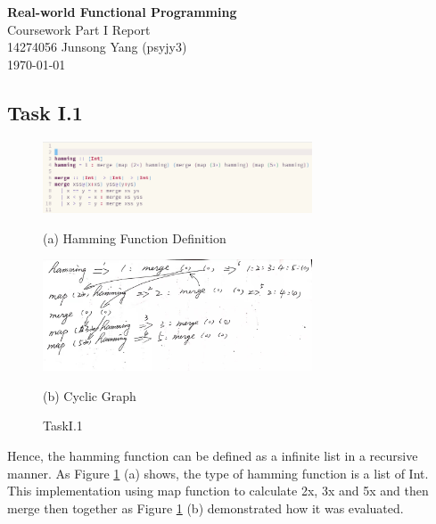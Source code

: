 \documentclass{article}
\begin{document}
\begin{center}
  \LARGE{\textbf{Real-world Functional Programming}} \\
  \Large{Coursework Part I Report} \\
  \normalsize{14274056 Junsong Yang (psyjy3)} \\
  \today
\end{center}


\begin{normalsize}
  \section{Task I.1}

  \begin{figure}[H]

    \begin{minipage}[b]{0.48\linewidth}
      \centering
      \centerline{\includegraphics[width=8.0cm]{Hamming}}
      \centerline{ (a) Hamming Function Definition}\medskip
    \end{minipage}
    \hfill
    \begin{minipage}[b]{0.48\linewidth}
      \centering
      \centerline{\includegraphics[width=8.0cm]{cyclic}}
      \centerline{ (b) Cyclic Graph}\medskip
    \end{minipage}
    \caption{TaskI.1}
    \label{fig:taskI.1}
  \end{figure}


  Hence, the hamming function can be defined as a infinite list in a recursive
  manner. As Figure \ref{fig:taskI.1} (a) shows, the type of hamming function is
  a list of Int. This implementation using map function to calculate 2x, 3x and
  5x and then merge then together as Figure \ref{fig:taskI.1} (b) demonstrated
  how it was evaluated.


\end{normalsize}
\end{document}
